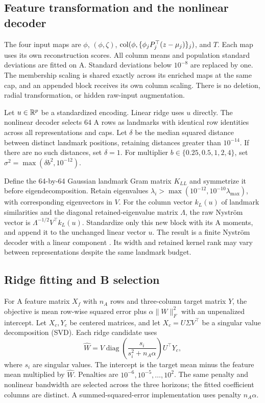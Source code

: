 \subsection{Feature transformation and the nonlinear decoder}
The four input maps are $\phi$, $(\phi,\zeta)$, $\operatorname{col}(\phi,\{\phi_jP_j^\top(z-\mu_j)\}_j)$, and $T$. Each map uses its own reconstruction scores. All column means and population standard deviations are fitted on A. Standard deviations below $10^{-8}$ are replaced by one. The membership scaling is shared exactly across its enriched maps at the same cap, and an appended block receives its own column scaling. There is no deletion, radial transformation, or hidden raw-input augmentation.

Let $u\in\mathbb R^p$ be a standardized encoding. Linear ridge uses $u$ directly. The nonlinear decoder selects 64 A rows as landmarks with identical row identities across all representations and caps. Let $\delta$ be the median squared distance between distinct landmark positions, retaining distances greater than $10^{-14}$. If there are no such distances, set $\delta=1$. For multiplier $b\in\{0.25,0.5,1,2,4\}$, set $\sigma^2=\max(\delta b^2,10^{-12})$.

Define the 64-by-64 Gaussian landmark Gram matrix $K_{LL}$ and symmetrize it before eigendecomposition. Retain eigenvalues $\lambda_i>\max(10^{-12},10^{-10}\lambda_{\max})$, with corresponding eigenvectors in $V$. For the column vector $k_L(u)$ of landmark similarities and the diagonal retained-eigenvalue matrix $\Lambda$, the raw Nystr\"om vector is $\Lambda^{-1/2}V^\top k_L(u)$. Standardize only this new block with its A moments, and append it to the unchanged linear vector $u$. The result is a finite Nystr\"om decoder with a linear component \citep{Williams2001Nystrom}. Its width and retained kernel rank may vary between representations despite the same landmark budget.

\subsection{Ridge fitting and B selection}
For A feature matrix $X_f$ with $n_A$ rows and three-column target matrix $Y$, the objective is mean row-wise squared error plus $\alpha\|W\|_F^2$ with an unpenalized intercept. Let $X_c,Y_c$ be centered matrices, and let $X_c=U\Sigma V^\top$ be a singular value decomposition (SVD). Each ridge candidate uses
\[
 \widehat W=V\operatorname{diag}\left(\frac{s_i}{s_i^2+n_A\alpha}\right)U^\top Y_c,
\]
where $s_i$ are singular values. The intercept is the target mean minus the feature mean multiplied by $\widehat W$. Penalties are $10^{-6},10^{-5},\ldots,10^2$. The same penalty and nonlinear bandwidth are selected across the three horizons; the fitted coefficient columns are distinct. A summed-squared-error implementation uses penalty $n_A\alpha$.

